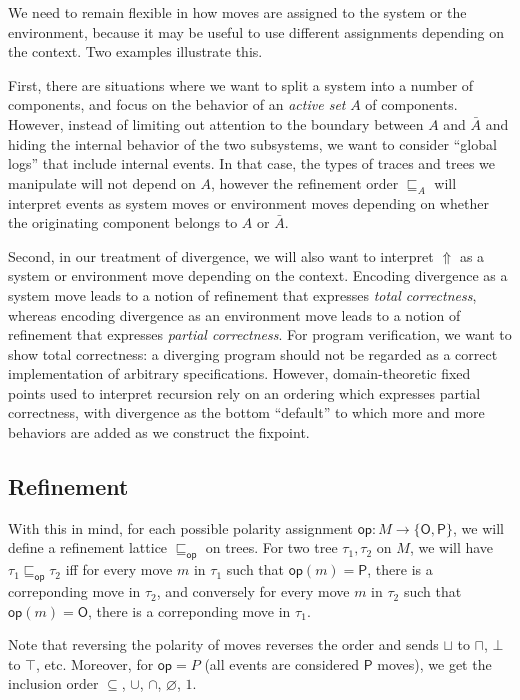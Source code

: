 \documentclass{article}
\newcommand{\kw}[1]{{\mathsf{#1}}}
\begin{document}
We need to remain flexible in how
moves are assigned to the system or the environment,
because it may be useful to use different assignments
depending on the context.
Two examples illustrate this.

First, there are situations where
we want to split a system into a number of components,
and focus on the behavior of an \emph{active set} $A$ of components.
However, instead of limiting out attention to
the boundary between $A$ and $\bar{A}$
and hiding the internal behavior of the two subsystems,
we want to consider ``global logs'' that include internal events.
In that case,
the types of traces and trees we manipulate will not depend on $A$,
however the refinement order $\sqsubseteq_A$
will interpret events as system moves or environment moves
depending on whether the originating component belongs to $A$ or $\bar{A}$.

Second, in our treatment of divergence,
we will also want to interpret $\Uparrow$ as a system or environment move
depending on the context.
Encoding divergence as a system move
leads to a notion of refinement that expresses \emph{total correctness},
whereas
encoding divergence as an environment move
leads to a notion of refinement that expresses \emph{partial correctness}.
For program verification,
we want to show total correctness:
a diverging program should not be regarded as
a correct implementation of arbitrary specifications.
However,
domain-theoretic fixed points used to interpret recursion
rely on an ordering which expresses partial correctness,
with divergence as the bottom ``default''
to which more and more behaviors are added
as we construct the fixpoint.

\subsection{Refinement}

With this in mind,
for each possible polarity assignment
$\kw{op} : M \rightarrow \{\kw{O}, \kw{P}\}$,
we will define a refinement lattice $\sqsubseteq_\kw{op}$ on trees.
For two tree $\tau_1, \tau_2$ on $M$,
we will have $\tau_1 \sqsubseteq_\kw{op} \tau_2$ iff
for every move $m$ in $\tau_1$ such that $\kw{op}(m) = \kw{P}$,
there is a correponding move in $\tau_2$, and conversely
for every move $m$ in $\tau_2$ such that $\kw{op}(m) = \kw{O}$,
there is a correponding move in $\tau_1$.

Note that reversing the polarity of moves
reverses the order and sends
$\sqcup$ to $\sqcap$, $\bot$ to $\top$, etc.
Moreover, for $\kw{op} = P$ (all events are considered $\kw{P}$ moves),
we get the inclusion order $\subseteq$, $\cup$, $\cap$, $\varnothing$, $1$.
\end{document}
